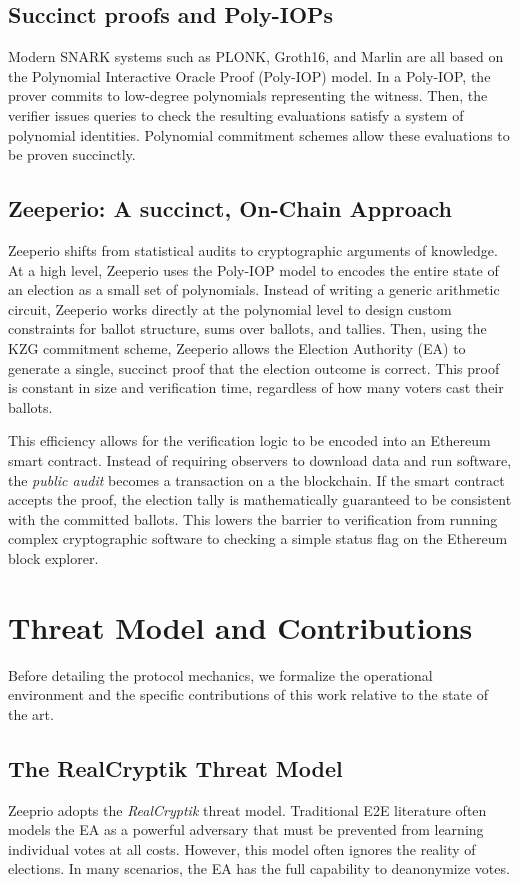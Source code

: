 \documentclass{llncs}
\begin{document}
\subsection{Succinct proofs and Poly-IOPs}

Modern SNARK systems such as PLONK, Groth16, and Marlin are all based on the Polynomial Interactive Oracle Proof (Poly-IOP) model.
In a Poly-IOP, the prover commits to low-degree polynomials representing the witness. Then, the verifier issues queries to check the resulting evaluations satisfy a system of polynomial identities.
Polynomial commitment schemes allow these evaluations to be proven succinctly.

\subsection{Zeeperio: A succinct, On-Chain Approach}
Zeeperio shifts from statistical audits to cryptographic arguments of knowledge. 
At a high level, Zeeperio uses the Poly-IOP model to encodes the entire state of an election as a small set of polynomials. 
Instead of writing a generic arithmetic circuit, Zeeperio works directly at the polynomial level to design custom constraints for ballot structure, sums over ballots, and tallies.
Then, using the KZG commitment scheme, Zeeperio allows the Election Authority (EA) to generate a single, succinct proof that the election outcome is correct.
This proof is constant in size and verification time, regardless of how many voters cast their ballots.

This efficiency allows for the verification logic to be encoded into an
Ethereum smart contract. Instead of requiring observers to download data and
run software, the \emph{public audit} becomes a transaction on a the blockchain. 
If the smart contract accepts the proof, the election tally is mathematically guaranteed to be consistent with the committed ballots. 
This lowers the barrier to verification from running complex cryptographic software to checking a simple status flag on the Ethereum block explorer.

\section{Threat Model and Contributions}

Before detailing the protocol mechanics, we formalize the operational environment and the specific contributions of this work relative to the state of the art.

\subsection{The RealCryptik Threat Model}
Zeeprio adopts the \textit{RealCryptik} threat model. 
Traditional E2E literature often models the EA as a powerful adversary that must be prevented from learning individual votes at all costs. 
However, this model often ignores the reality of elections. In many scenarios, the EA has the full capability to deanonymize votes.
\end{document}
